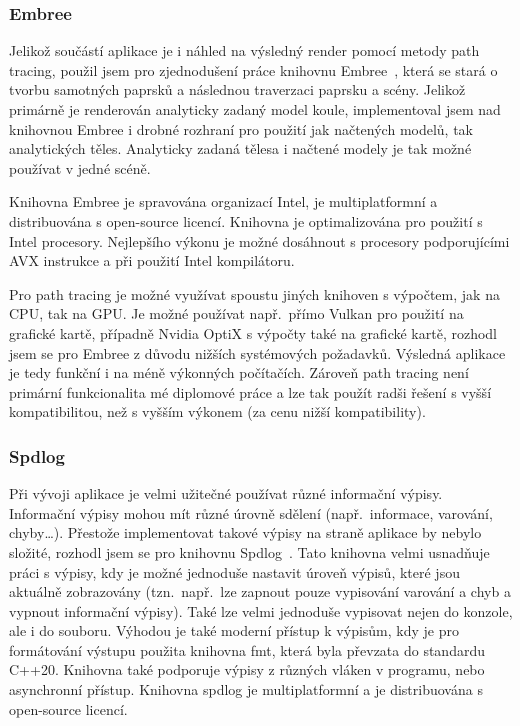 \documentclass[czech,master]{diploma}
\begin{document}
\subsubsection{Embree}
Jelikož součástí aplikace je i náhled na výsledný render pomocí metody path tracing, použil jsem pro zjednodušení práce knihovnu Embree~\cite{sourceEmbree}, která se stará o tvorbu samotných paprsků a následnou traverzaci paprsku a scény. Jelikož primárně je renderován analyticky zadaný model koule, implementoval jsem nad knihovnou Embree i drobné rozhraní pro použití jak načtených modelů, tak analytických těles. Analyticky zadaná tělesa i načtené modely je tak možné používat v jedné scéně.\par
Knihovna Embree je spravována organizací Intel, je multiplatformní a distribuována s open-source licencí. Knihovna je optimalizována pro použití s Intel procesory. Nejlepšího výkonu je možné dosáhnout s procesory podporujícími AVX instrukce a při použití Intel kompilátoru.\par
Pro path tracing je možné využívat spoustu jiných knihoven s výpočtem, jak na CPU, tak na GPU\@. Je možné používat např.\ přímo Vulkan pro použití na grafické kartě, případně Nvidia OptiX s výpočty také na grafické kartě, rozhodl jsem se pro Embree z důvodu nižších systémových požadavků. Výsledná aplikace je tedy funkční i na méně výkonných počítačích. Zároveň path tracing není primární funkcionalita mé diplomové práce a lze tak použít radši řešení s vyšší kompatibilitou, než s vyšším výkonem (za cenu nižší kompatibility).

\subsubsection{Spdlog}
Při vývoji aplikace je velmi užitečné používat různé informační výpisy. Informační výpisy mohou mít různé úrovně sdělení (např.\ informace, varování, chyby\dots). Přestože implementovat takové výpisy na straně aplikace by nebylo složité, rozhodl jsem se pro knihovnu Spdlog~\cite{sourceSpdlog}. Tato knihovna velmi usnadňuje práci s výpisy, kdy je možné jednoduše nastavit úroveň výpisů, které jsou aktuálně zobrazovány (tzn.\ např.\ lze zapnout pouze vypisování varování a chyb a vypnout informační výpisy). Také lze velmi jednoduše vypisovat nejen do konzole, ale i do souboru. Výhodou je také moderní přístup k výpisům, kdy je pro formátování výstupu použita knihovna fmt, která byla převzata do standardu C++20. Knihovna také podporuje výpisy z různých vláken v programu, nebo asynchronní přístup. Knihovna spdlog je multiplatformní a je distribuována s open-source licencí.
\end{document}
